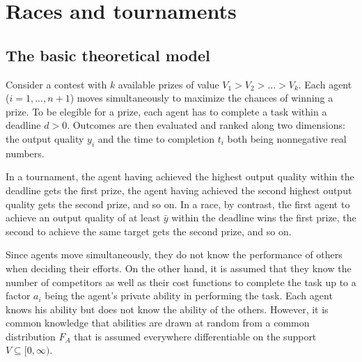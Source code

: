 \section{Races and tournaments}\label{races-and-tournaments}

\newcommand{\note}[1]{\textcolor{red}{[#1]}} %
\newcommand\ability{a_i}
\newcommand\marginaltype{\underline a}
\newcommand\cscore{c_{y}}                   %
\newcommand\ctime{c_{t}}
\newcommand\dord[2][X]{f_{#1_{#2:n}}}  %
\newcommand\pord[2][X]{F_{#1_{#2:n}}}
\newcommand\bidscore{y^*}                   %
\newcommand\bidtime{t^*}
\newcommand\invertb{b^{-1}}
\newcommand\lowercost{\underline{c}}        %
\newcommand\uppercost{\bar{c}}
\newcommand\deadline{d}
\newcommand\tweight{\tau}
\newcommand\target{\bar y}
\newcommand\entrylimit{\bar\theta}
\newcommand{\Expect}{{\bf E}}      %
\newcommand\realsp{\mathbb{R}^{+}}

\subsection{The basic theoretical
model}\label{the-basic-theoretical-model}

Consider a contest with \(k\) available prizes of value
\(V_1 > V_2 > ... > V_k\). Each agent (\(i=1, ..., n+1\)) moves
simultaneously to maximize the chances of winning a prize. To be
elegible for a prize, each agent has to complete a task within a
deadline \(d>0\). Outcomes are then evaluated and ranked along two
dimensions: the output quality \(y_i\) and the time to completion
\(t_i\) both being nonnegative real numbers.

In a tournament, the agent having achieved the highest output quality
within the deadline gets the first prize, the agent having achieved the
second highest output quality gets the second prize, and so on. In a
race, by contrast, the first agent to achieve an output quality of at
least \(\target\) within the deadline wins the first prize, the second
to achieve the same target gets the second prize, and so on.

Since agents move simultaneously, they do not know the performance of
others when deciding their efforts. On the other hand, it is assumed
that they know the number of competitors as well as their cost functions
to complete the task up to a factor \(a_i\) being the agent's private
ability in performing the task. Each agent knows his ability but does
not know the ability of the others. However, it is common knowledge that
abilities are drawn at random from a common distribution \(F_A\) that is
assumed everywhere differentiable on the support
\(V\subseteq [0, \infty)\).

